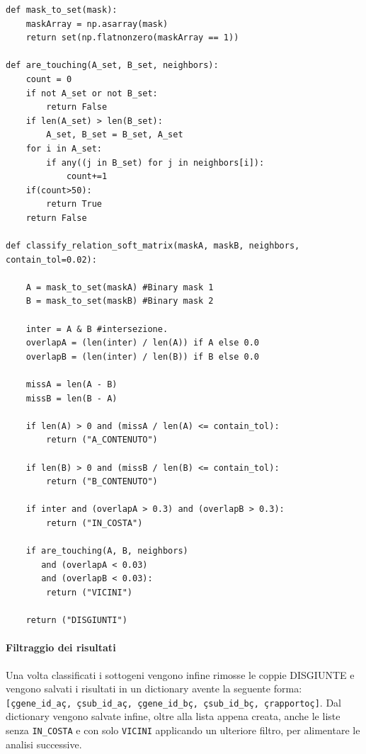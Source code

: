 \begin{lstlisting}[style=mypython,
                   label=code:rapportoSottogeni,
                   caption={Calcolo del rappporto dei sottogeni},
                   basicstyle=\ttfamily\scriptsize]
def mask_to_set(mask):
    maskArray = np.asarray(mask)
    return set(np.flatnonzero(maskArray == 1)) 

def are_touching(A_set, B_set, neighbors):
    count = 0
    if not A_set or not B_set:
        return False
    if len(A_set) > len(B_set):
        A_set, B_set = B_set, A_set
    for i in A_set:
        if any((j in B_set) for j in neighbors[i]):
            count+=1
    if(count>50):
        return True
    return False
  
def classify_relation_soft_matrix(maskA, maskB, neighbors, contain_tol=0.02):
    
    A = mask_to_set(maskA) #Binary mask 1
    B = mask_to_set(maskB) #Binary mask 2

    inter = A & B #intersezione.
    overlapA = (len(inter) / len(A)) if A else 0.0
    overlapB = (len(inter) / len(B)) if B else 0.0

    missA = len(A - B)
    missB = len(B - A)

    if len(A) > 0 and (missA / len(A) <= contain_tol):
        return ("A_CONTENUTO")

    if len(B) > 0 and (missB / len(B) <= contain_tol):
        return ("B_CONTENUTO")

    if inter and (overlapA > 0.3) and (overlapB > 0.3):
        return ("IN_COSTA")

    if are_touching(A, B, neighbors) 
       and (overlapA < 0.03) 
       and (overlapB < 0.03):
        return ("VICINI")

    return ("DISGIUNTI")
\end{lstlisting}


\paragraph{Filtraggio dei risultati\\}
Una volta classificati i sottogeni vengono infine rimosse le coppie DISGIUNTE e 
vengono salvati i risultati in un dictionary avente la seguente forma: 
\texttt{[çgene\_id\_aç, çsub\_id\_aç, çgene\_id\_bç, çsub\_id\_bç, çrapportoç]}.
Dal dictionary vengono salvate infine, oltre alla lista appena creata, anche le liste
senza \texttt{IN\_COSTA} e con solo \texttt{VICINI} applicando un ulteriore filtro, per alimentare le analisi successive.

